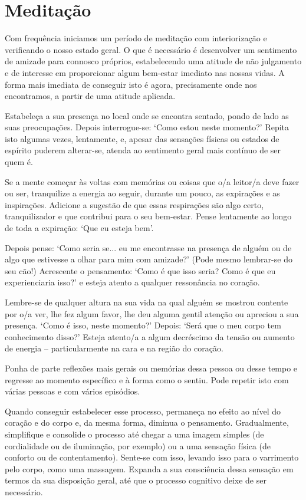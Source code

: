 
\chapter{Meditação}


Com frequência iniciamos um período de meditação com interiorização e verificando o nosso estado geral. O que é necessário é desenvolver um sentimento de amizade para connosco próprios, estabelecendo uma atitude de não julgamento e de interesse em proporcionar algum bem-estar imediato nas nossas vidas. A forma mais imediata de conseguir isto é agora, precisamente onde nos encontramos, a partir de uma atitude aplicada.

Estabeleça a sua presença no local onde se encontra sentado, pondo de lado as suas preocupações. Depois interrogue-se: `Como estou neste momento?' Repita isto algumas vezes, lentamente, e, apesar das sensações físicas ou estados de espírito puderem alterar-se, atenda ao sentimento geral mais contínuo de ser quem é.

Se a mente começar às voltas com memórias ou coisas que o/a leitor/a deve fazer ou ser, tranquilize a energia ao seguir, durante um pouco, as expirações e as inspirações. Adicione a sugestão de que essas respirações são algo certo, tranquilizador e que contribui para o seu bem-estar. Pense lentamente ao longo de toda a expiração: `Que eu esteja bem'.

Depois pense: `Como seria se... eu me encontrasse na presença de alguém ou de algo que estivesse a olhar para mim com amizade?' (Pode mesmo lembrar-se do seu cão!) Acrescente o pensamento: `Como é que isso seria? Como é que eu experienciaria isso?' e esteja atento a qualquer ressonância no coração.

Lembre-se de qualquer altura na sua vida na qual alguém se mostrou contente por o/a ver, lhe fez algum favor, lhe deu alguma gentil atenção ou apreciou a sua presença. `Como é isso, neste momento?' Depois: `Será que o meu corpo tem conhecimento disso?' Esteja atento/a a algum decréscimo da tensão ou aumento de energia -- particularmente na cara e na região do coração.

Ponha de parte reflexões mais gerais ou memórias dessa pessoa ou desse tempo e regresse ao momento específico e à forma como o sentiu. Pode repetir isto com várias pessoas e com vários episódios.

Quando conseguir estabelecer esse processo, permaneça no efeito ao nível do coração e do corpo e, da mesma forma, diminua o pensamento. Gradualmente, simplifique e consolide o processo até chegar a uma imagem simples (de cordialidade ou de iluminação, por exemplo) ou a uma sensação física (de conforto ou de contentamento). Sente-se com isso, levando isso para o varrimento pelo corpo, como uma massagem. Expanda a sua consciência dessa sensação em termos da sua disposição geral, até que o processo cognitivo deixe de ser necessário.

